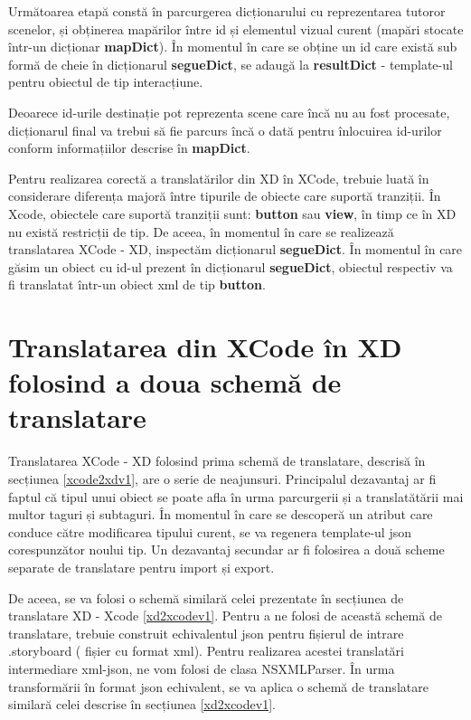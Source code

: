 Următoarea etapă constă în parcurgerea dicționarului cu reprezentarea tutoror scenelor, și obținerea mapărilor între id și elementul vizual curent (mapări stocate într-un dicționar \textbf{mapDict}). În momentul în care se obține un id care există sub formă de cheie în dicționarul \textbf{segueDict}, se adaugă la \textbf{resultDict} - template-ul pentru obiectul de tip interacțiune. 

Deoarece id-urile destinație pot reprezenta scene care încă nu au fost procesate, dicționarul final va trebui să fie parcurs încă o dată pentru înlocuirea id-urilor conform informațiilor descrise în \textbf{mapDict}.

Pentru realizarea corectă a translatărilor din XD în XCode, trebuie luată în considerare diferența majoră între tipurile de obiecte care suportă tranziții. În Xcode, obiectele care suportă tranziții sunt: \textbf{button} sau \textbf{view}, în timp ce în XD nu există restricții de tip. De aceea, în momentul în care se realizează translatarea XCode - XD, inspectăm dicționarul \textbf{segueDict}. În momentul în care găsim un obiect cu id-ul prezent în dicționarul \textbf{segueDict}, obiectul respectiv va fi translatat într-un obiect xml de tip \textbf{button}.

\section {Translatarea din XCode în XD folosind a doua schemă de translatare} \label{xcxd2schema}

Translatarea XCode - XD folosind prima schemă de translatare, descrisă în secțiunea \ref{xcode2xdv1}, are o serie de neajunsuri. Principalul dezavantaj ar fi faptul că tipul unui obiect se poate afla în urma parcurgerii și a translatătării mai multor taguri și subtaguri. În momentul în care se descoperă un atribut care conduce către modificarea tipului curent, se va regenera template-ul json corespunzător noului tip.  
Un dezavantaj secundar ar fi folosirea a două scheme separate de translatare pentru import și export.

De aceea, se va folosi o schemă similară celei prezentate în secțiunea de translatare XD - Xcode \ref{xd2xcodev1}. Pentru a ne folosi de această schemă de translatare, trebuie construit echivalentul json pentru fișierul de intrare .storyboard ( fișier cu format xml). Pentru realizarea acestei translatări intermediare xml-json, ne vom folosi de clasa NSXMLParser. În urma transformării în format json echivalent, se va aplica o schemă de translatare similară celei descrise în secțiunea \ref{xd2xcodev1}.

